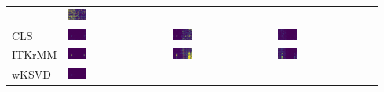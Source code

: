 \begin{tabular}{m{}*{3}{M{0.21\textwidth}}}
&\includegraphics[width=0.2\textwidth]{img/chapitre4/figure15/synth_hole/SynthH_3S_band_2.png}
\\
CLS
&\includegraphics[width=0.2\textwidth]{img/chapitre4/figure15/synth_hole/SynthH_CLS_band_0.png}
&\includegraphics[width=0.2\textwidth]{img/chapitre4/figure15/synth_hole/SynthH_CLS_band_1.png}
&\includegraphics[width=0.2\textwidth]{img/chapitre4/figure15/synth_hole/SynthH_CLS_band_2.png}
\\
ITKrMM
&\includegraphics[width=0.2\textwidth]{img/chapitre4/figure15/synth_hole/SynthH_ITKrMM_matlab_band_0.png}
&\includegraphics[width=0.2\textwidth]{img/chapitre4/figure15/synth_hole/SynthH_ITKrMM_matlab_band_1.png}
&\includegraphics[width=0.2\textwidth]{img/chapitre4/figure15/synth_hole/SynthH_ITKrMM_matlab_band_2.png}
\\
wKSVD
&\includegraphics[width=0.2\textwidth]{img/chapitre4/figure15/synth_hole/SynthH_wKSVD_matlab_band_0.png}

\end{tabular}
